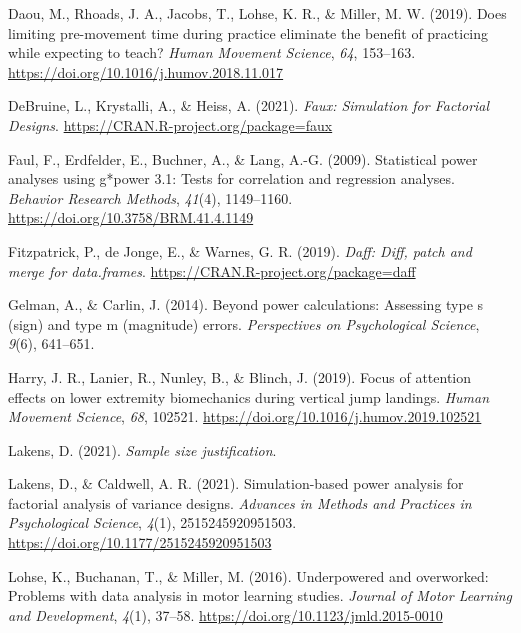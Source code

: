 \documentclass[
  man, donotrepeattitle,mask,floatsintext]{apa7}
\newlength{\cslhangindent}
\newlength{\cslentryspacingunit} %
\newenvironment{CSLReferences}[2] %
 {%
  \setlength{\parindent}{0pt}
  \ifodd #1
  \let\oldpar\par
  \def\par{\hangindent=\cslhangindent\oldpar}
  \fi
  \setlength{\parskip}{#2\cslentryspacingunit}
 }%
 {}
\begin{document}
\begin{CSLReferences}{1}{0}
\leavevmode{}%
Daou, M., Rhoads, J. A., Jacobs, T., Lohse, K. R., \& Miller, M. W. (2019). Does limiting pre-movement time during practice eliminate the benefit of practicing while expecting to teach? \emph{Human Movement Science}, \emph{64}, 153--163. \url{https://doi.org/10.1016/j.humov.2018.11.017}

\leavevmode{}%
DeBruine, L., Krystalli, A., \& Heiss, A. (2021). \emph{Faux: {Simulation} for {Factorial} {Designs}}. \url{https://CRAN.R-project.org/package=faux}

\leavevmode{}%
Faul, F., Erdfelder, E., Buchner, A., \& Lang, A.-G. (2009). Statistical power analyses using g*power 3.1: Tests for correlation and regression analyses. \emph{Behavior Research Methods}, \emph{41}(4), 1149--1160. \url{https://doi.org/10.3758/BRM.41.4.1149}

\leavevmode{}%
Fitzpatrick, P., de Jonge, E., \& Warnes, G. R. (2019). \emph{Daff: Diff, patch and merge for data.frames}. \url{https://CRAN.R-project.org/package=daff}

\leavevmode{}%
Gelman, A., \& Carlin, J. (2014). Beyond power calculations: Assessing type s (sign) and type m (magnitude) errors. \emph{Perspectives on Psychological Science}, \emph{9}(6), 641--651.

\leavevmode{}%
Harry, J. R., Lanier, R., Nunley, B., \& Blinch, J. (2019). Focus of attention effects on lower extremity biomechanics during vertical jump landings. \emph{Human Movement Science}, \emph{68}, 102521. \url{https://doi.org/10.1016/j.humov.2019.102521}

\leavevmode{}%
Lakens, D. (2021). \emph{Sample size justification}.

\leavevmode{}%
Lakens, D., \& Caldwell, A. R. (2021). Simulation-based power analysis for factorial analysis of variance designs. \emph{Advances in Methods and Practices in Psychological Science}, \emph{4}(1), 2515245920951503. \url{https://doi.org/10.1177/2515245920951503}

\leavevmode{}%
Lohse, K., Buchanan, T., \& Miller, M. (2016). Underpowered and overworked: Problems with data analysis in motor learning studies. \emph{Journal of Motor Learning and Development}, \emph{4}(1), 37--58. \url{https://doi.org/10.1123/jmld.2015-0010}


\end{CSLReferences}
\end{document}
